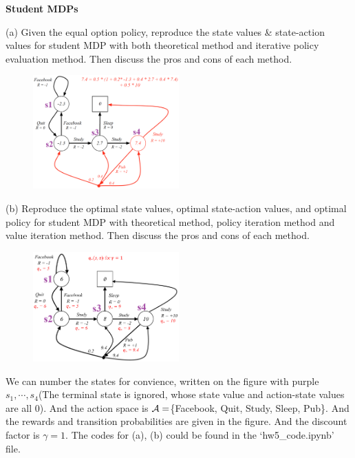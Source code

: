 \begin{homeworkProblem}

\textbf{Student MDPs}

(a) Given the equal option policy, reproduce the state values \& state-action values for student MDP with both theoretical method and iterative policy evaluation method. Then discuss the pros and cons of each method.
\begin{figure}[h]
    \centering
    \includegraphics[width=0.5\textwidth]{./figure/MDP1.png}
\end{figure}

(b) Reproduce the optimal state values, optimal state-action values, and optimal policy for student MDP with theoretical method, policy iteration method and value iteration method. Then discuss the pros and cons of each method.
\begin{figure}[h]
    \centering
    \includegraphics[width=0.5\textwidth]{./figure/MDP2.png}\
    \vspace{-0.5cm}
\end{figure}

\solution

We can number the states for convience, written on the figure with purple $s_1,\cdots,s_4$(The terminal state is ignored, whose state value and action-state values are all $0$). And the action space is $\mathcal{A}=$\{Facebook, Quit, Study, Sleep, Pub\}. And the rewards and transition probabilities are given in the figure. And the discount factor is $\gamma=1$. The codes for (a), (b) could be found in the `hw5\_code.ipynb' file.


\end{homeworkProblem}
